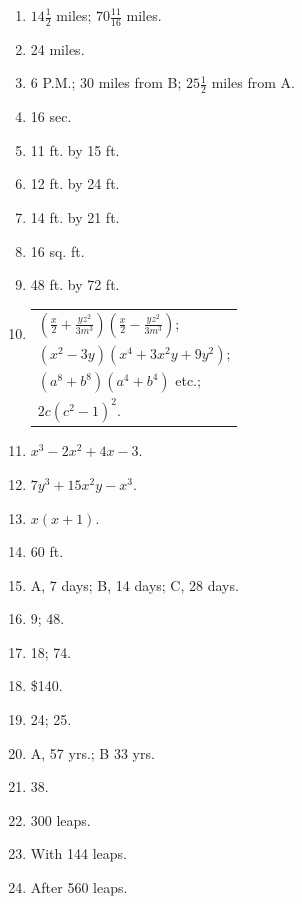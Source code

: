 \documentclass{book}
\begin{document}
\begin{enumerate}
\item  $14\frac{1}{2}$ miles; $70\frac{11}{16}$ miles.

\item  24 miles.

\item  6 P.M.; 30 miles from B; $25\frac{1}{2}$ miles from A.

\item  16 sec.

\item  11 ft. by 15 ft.

\item  12 ft. by 24 ft.

\item  14 ft. by 21 ft.

\item  16 sq. ft.

\item  48 ft. by 72 ft.

\item
\begin{tabular}{l}
   $\displaystyle \left( \frac{x}{2} + \frac{yz^2}{3m^3} \right)
   \left( \frac{x}{2} - \frac{yz^2}{3m^3} \right) $;   \\
   $(x^2 - 3y)(x^4 + 3x^2y + 9 y^2) $; \\
   $(a^8 + b^8)(a^4 + b^4)$ etc.;   \\
   $2c(c^2 - 1)^2$.
\end{tabular}

\item  $x^3 -2x^2 + 4x -3$.

\item  $7y^3 + 15x^2y - x^3$.

\item  $x(x + 1)$.

\item  60 ft.

\item  A, 7 days; B, 14 days; C, 28 days.

\item  9; 48.

\item  18; 74.

\item \$140.

\item  24; 25.

\item  A, 57 yrs.; B 33 yrs.

\item  38.

\item  300 leaps.

\item  With 144 leaps.

\item  After 560 leaps.
\end{enumerate}
\end{document}
